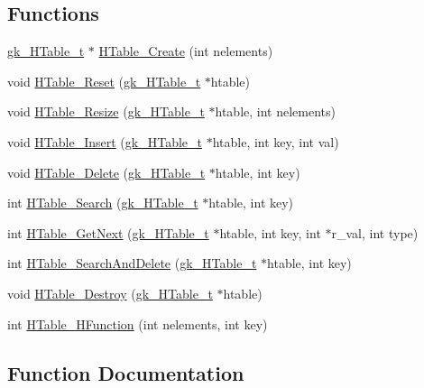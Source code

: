 \subsection*{Functions}
\begin{DoxyCompactItemize}
\item 
\hyperlink{a00650}{gk\+\_\+\+H\+Table\+\_\+t} $\ast$ \hyperlink{a00098_a8dc2b324b10c45883dacbf58ac0b7efd}{H\+Table\+\_\+\+Create} (int nelements)
\item 
void \hyperlink{a00098_a8a914231592293527bd1f42cdfb346d4}{H\+Table\+\_\+\+Reset} (\hyperlink{a00650}{gk\+\_\+\+H\+Table\+\_\+t} $\ast$htable)
\item 
void \hyperlink{a00098_ad79cb786b03a73481fb3e5846d345801}{H\+Table\+\_\+\+Resize} (\hyperlink{a00650}{gk\+\_\+\+H\+Table\+\_\+t} $\ast$htable, int nelements)
\item 
void \hyperlink{a00098_a39853dc7129323e7846d895c9026ad6f}{H\+Table\+\_\+\+Insert} (\hyperlink{a00650}{gk\+\_\+\+H\+Table\+\_\+t} $\ast$htable, int key, int val)
\item 
void \hyperlink{a00098_a19564e2cf9bc13d7ba8b8d4ed2e9b1d1}{H\+Table\+\_\+\+Delete} (\hyperlink{a00650}{gk\+\_\+\+H\+Table\+\_\+t} $\ast$htable, int key)
\item 
int \hyperlink{a00098_a2b610fbd6017e0ef2e393c563b4809a5}{H\+Table\+\_\+\+Search} (\hyperlink{a00650}{gk\+\_\+\+H\+Table\+\_\+t} $\ast$htable, int key)
\item 
int \hyperlink{a00098_a226d34f299950350235ed2f54146c292}{H\+Table\+\_\+\+Get\+Next} (\hyperlink{a00650}{gk\+\_\+\+H\+Table\+\_\+t} $\ast$htable, int key, int $\ast$r\+\_\+val, int type)
\item 
int \hyperlink{a00098_acb372a5e2569817f3a10cbeababda100}{H\+Table\+\_\+\+Search\+And\+Delete} (\hyperlink{a00650}{gk\+\_\+\+H\+Table\+\_\+t} $\ast$htable, int key)
\item 
void \hyperlink{a00098_a4552b6bc8e0b509913638222daecf3aa}{H\+Table\+\_\+\+Destroy} (\hyperlink{a00650}{gk\+\_\+\+H\+Table\+\_\+t} $\ast$htable)
\item 
int \hyperlink{a00098_afe255e126a6c4eec5efb11c3691b3155}{H\+Table\+\_\+\+H\+Function} (int nelements, int key)
\end{DoxyCompactItemize}


\subsection{Function Documentation}
\mbox{\label{a00098_a8dc2b324b10c45883dacbf58ac0b7efd}} 
